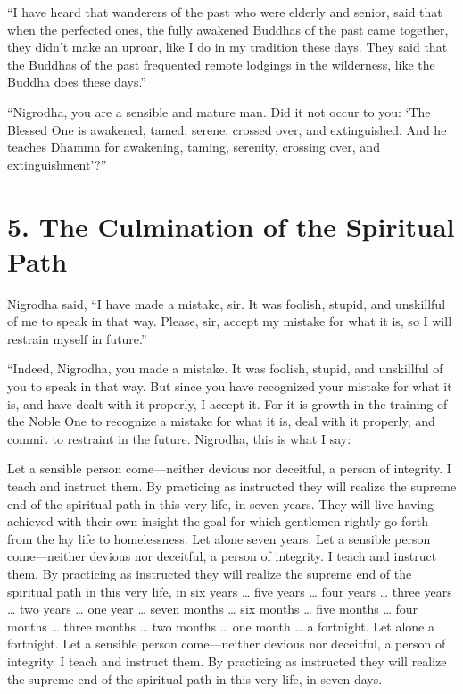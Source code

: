 \documentclass[12pt,openany]{book}%
\begin{document}
“I have heard that wanderers of the past who were elderly and senior, said that when the perfected ones, the fully awakened Buddhas of the past came together, they didn’t make an uproar, like I do in my tradition these days. They said that the Buddhas of the past frequented remote lodgings in the wilderness, like the Buddha does these days.” 

“Nigrodha, you are a sensible and mature man. Did it not occur to you: ‘The Blessed One is awakened, tamed, serene, crossed over, and extinguished. And he teaches Dhamma for awakening, taming, serenity, crossing over, and extinguishment’?” 

\section*{5. The Culmination of the Spiritual Path }

Nigrodha said, “I have made a mistake, sir. It was foolish, stupid, and unskillful of me to speak in that way. Please, sir, accept my mistake for what it is, so I will restrain myself in future.” 

“Indeed, Nigrodha, you made a mistake. It was foolish, stupid, and unskillful of you to speak in that way. But since you have recognized your mistake for what it is, and have dealt with it properly, I accept it. For it is growth in the training of the Noble One to recognize a mistake for what it is, deal with it properly, and commit to restraint in the future. Nigrodha, this is what I say: 

Let a sensible person come—neither devious nor deceitful, a person of integrity. I teach and instruct them. By practicing as instructed they will realize the supreme end of the spiritual path in this very life, in seven years. They will live having achieved with their own insight the goal for which gentlemen rightly go forth from the lay life to homelessness. Let alone seven years. Let a sensible person come—neither devious nor deceitful, a person of integrity. I teach and instruct them. By practicing as instructed they will realize the supreme end of the spiritual path in this very life, in six years … five years … four years … three years … two years … one year … seven months … six months … five months … four months … three months … two months … one month … a fortnight. Let alone a fortnight. Let a sensible person come—neither devious nor deceitful, a person of integrity. I teach and instruct them. By practicing as instructed they will realize the supreme end of the spiritual path in this very life, in seven days. 
\end{document}
